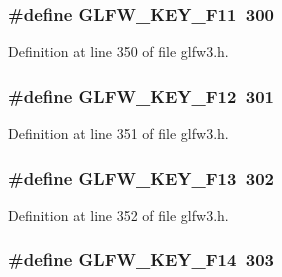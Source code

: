 \subsubsection[{G\+L\+F\+W\+\_\+\+K\+E\+Y\+\_\+\+F11}]{\setlength{\rightskip}{0pt plus 5cm}\#define G\+L\+F\+W\+\_\+\+K\+E\+Y\+\_\+\+F11~300}\label{group__keys_ga0bc04b11627e7d69339151e7306b2832}


Definition at line 350 of file glfw3.\+h.

\hypertarget{group__keys_gaf5908fa9b0a906ae03fc2c61ac7aa3e2}{}
\subsubsection[{G\+L\+F\+W\+\_\+\+K\+E\+Y\+\_\+\+F12}]{\setlength{\rightskip}{0pt plus 5cm}\#define G\+L\+F\+W\+\_\+\+K\+E\+Y\+\_\+\+F12~301}\label{group__keys_gaf5908fa9b0a906ae03fc2c61ac7aa3e2}


Definition at line 351 of file glfw3.\+h.

\hypertarget{group__keys_gad637f4308655e1001bd6ad942bc0fd4b}{}
\subsubsection[{G\+L\+F\+W\+\_\+\+K\+E\+Y\+\_\+\+F13}]{\setlength{\rightskip}{0pt plus 5cm}\#define G\+L\+F\+W\+\_\+\+K\+E\+Y\+\_\+\+F13~302}\label{group__keys_gad637f4308655e1001bd6ad942bc0fd4b}


Definition at line 352 of file glfw3.\+h.

\hypertarget{group__keys_gaf14c66cff3396e5bd46e803c035e6c1f}{}
\subsubsection[{G\+L\+F\+W\+\_\+\+K\+E\+Y\+\_\+\+F14}]{\setlength{\rightskip}{0pt plus 5cm}\#define G\+L\+F\+W\+\_\+\+K\+E\+Y\+\_\+\+F14~303}\label{group__keys_gaf14c66cff3396e5bd46e803c035e6c1f}


